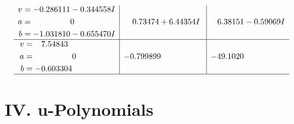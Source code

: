 \documentclass[1p]{elsarticle_modified}
\theoremstyle{definition}
\begin{document}
$$\begin{array}{c|c|c}
\begin{aligned}
v &= -0.286111 - 0.344558 I \\
a &= \phantom{-0.000000 } 0 \\
b &= -1.031810 - 0.655470 I\end{aligned}
 & \phantom{-}0.73474 + 6.44354 I & \phantom{-}6.38151 - 0.59069 I \\ \hline\begin{aligned}
v &= \phantom{-}7.54843\phantom{ +0.000000I} \\
a &= \phantom{-0.000000 } 0 \\
b &= -0.603304\phantom{ +0.000000I}\end{aligned}
 & -0.799899\phantom{ +0.000000I} & -49.1020\phantom{ +0.000000I}\\
 \hline 
 \end{array}$$\newpage
\newpage\renewcommand{\arraystretch}{1}
\centering \section*{ IV. u-Polynomials}
\end{document}
